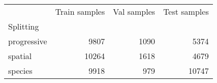 \begin{tabular}{lrrr}
\toprule
{} &  Train samples &  Val samples &  Test samples \\
Splitting   &                &              &               \\
\midrule
progressive &           9807 &         1090 &          5374 \\
spatial     &          10264 &         1618 &          4679 \\
species     &           9918 &          979 &         10747 \\
\bottomrule
\end{tabular}
